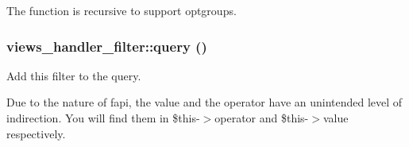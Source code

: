 The function is recursive to support optgroups. \hypertarget{classviews__handler__filter_a8e513b3abbc2559f37b550ca4957b4ae}{
\subsubsection[{query}]{\setlength{\rightskip}{0pt plus 5cm}views\_\-handler\_\-filter::query ()}}
\label{classviews__handler__filter_a8e513b3abbc2559f37b550ca4957b4ae}
Add this filter to the query.

Due to the nature of fapi, the value and the operator have an unintended level of indirection. You will find them in \$this-\/$>$operator and \$this-\/$>$value respectively. 

